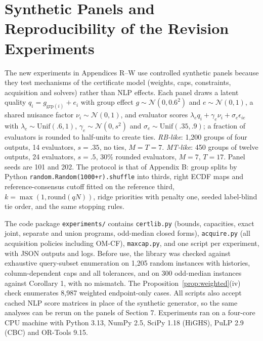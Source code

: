 \documentclass[11pt]{article}
\begin{document}
\section{Synthetic Panels and Reproducibility of the Revision Experiments}
\label{app:synthetic}
The new experiments in Appendices R--W use controlled synthetic panels because they test mechanisms of the certificate model (weights, caps, constraints, acquisition and solvers) rather than NLP effects. Each panel draws a latent quality $q_i=g_{\mathrm{grp}(i)}+e_i$ with group effect $g\sim\mathcal N(0,0.6^2)$ and $e\sim\mathcal N(0,1)$, a shared nuisance factor $\nu_i\sim\mathcal N(0,1)$, and evaluator scores $\lambda_eq_i+\gamma_e\nu_i+\sigma_e\epsilon_{ie}$ with $\lambda_e\sim\mathrm{Unif}(.6,1)$, $\gamma_e\sim\mathcal N(0,s^2)$ and $\sigma_e\sim\mathrm{Unif}(.35,.9)$; a fraction of evaluators is rounded to half-units to create ties. \emph{RB-like}: 1,200 groups of four outputs, 14 evaluators, $s=.35$, no ties, $M=T=7$. \emph{MT-like}: 450 groups of twelve outputs, 24 evaluators, $s=.5$, 30\% rounded evaluators, $M=7$, $T=17$. Panel seeds are 101 and 202. The protocol is that of Appendix B: group splits by Python \texttt{random.Random(1000+r).shuffle} into thirds, right ECDF maps and reference-consensus cutoff fitted on the reference third, $k=\max(1,\mathrm{round}(qN))$, ridge priorities with penalty one, seeded label-blind tie order, and the same stopping rules.

The code package \texttt{experiments/} contains \texttt{certlib.py} (bounds, capacities, exact joint, separate and union programs, odd-median closed forms), \texttt{acquire.py} (all acquisition policies including OM-CF), \texttt{maxcap.py}, and one script per experiment, with JSON outputs and logs. Before use, the library was checked against exhaustive query-subset enumeration on 1,205 random instances with histories, column-dependent caps and all tolerances, and on 300 odd-median instances against Corollary 1, with no mismatch. The Proposition~\ref{prop:weighted}(iv) check enumerates 8,987 weighted endpoint-only cases. All scripts also accept cached NLP score matrices in place of the synthetic generator, so the same analyses can be rerun on the panels of Section 7. Experiments ran on a four-core CPU machine with Python 3.13, NumPy 2.5, SciPy 1.18 (HiGHS), PuLP 2.9 (CBC) and OR-Tools 9.15.


\end{document}
